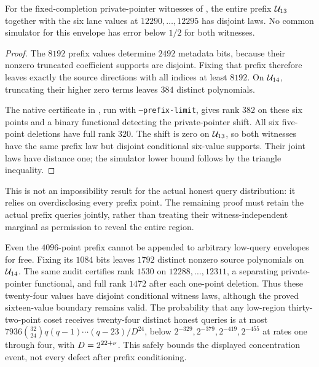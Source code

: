 \begin{proposition}\label{prop:zk-full-prefix-envelope}
For the fixed-completion private-pointer witnesses of , the entire prefix $\mathcal{U}_{13}$ together with the six lane values at $12290,\ldots,12295$ has disjoint laws. No common simulator for this envelope has error below $1/2$ for both witnesses.
\end{proposition}
\begin{proof}
The $8192$ prefix values determine $2492$ metadata bits, because their nonzero truncated coefficient supports are disjoint. Fixing that prefix therefore leaves exactly the source directions with all indices at least $8192$. On $\mathcal{U}_{14}$, truncating their higher zero terms leaves $384$ distinct polynomials.

The native certificate in , run with \texttt{--prefix-limit}, gives rank $382$ on these six points and a binary functional detecting the private-pointer shift. All six five-point deletions have full rank $320$. The shift is zero on $\mathcal{U}_{13}$, so both witnesses have the same prefix law but disjoint conditional six-value supports. Their joint laws have distance one; the simulator lower bound follows by the triangle inequality.
\end{proof}

This is not an impossibility result for the actual honest query distribution: it relies on overdisclosing every prefix point. The remaining proof must retain the actual prefix queries jointly, rather than treating their witness-independent marginal as permission to reveal the entire region.

Even the $4096$-point prefix cannot be appended to arbitrary low-query envelopes for free. Fixing its $1084$ bits leaves $1792$ distinct nonzero source polynomials on $\mathcal{U}_{14}$. The same audit certifies rank $1530$ on $12288,\ldots,12311$, a separating private-pointer functional, and full rank $1472$ after each one-point deletion. Thus these twenty-four values have disjoint conditional witness laws, although the proved sixteen-value boundary remains valid. The probability that any low-region thirty-two-point coset receives twenty-four distinct honest queries is at most $7936\binom{32}{24}q(q-1)\cdots(q-23)/D^{24}$, below $2^{-329},2^{-379},2^{-419},2^{-455}$ at rates one through four, with $D=2^{22+\nu}$. This safely bounds the displayed concentration event, not every defect after prefix conditioning.


